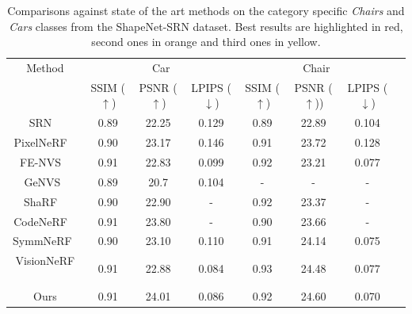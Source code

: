 \begin{table}[h!]
\caption{Comparisons against state of the art methods on the category specific \textit{Chairs} and \textit{Cars} classes from the ShapeNet-SRN dataset. Best results are highlighted in red, second ones in orange and third ones in yellow. }
\label{table:comp_res}
\begin{center}%
\begin{adjustbox}{width = \linewidth}
\begin{tabular}[h]{c||ccccccc}
\hline
 Method & \multicolumn{3}{c}{Car} & \multicolumn{3}{c}{Chair} \\
 &  SSIM ($\uparrow$) & PSNR ($\uparrow$) & LPIPS ($\downarrow$) & SSIM ($\uparrow$) & PSNR ($\uparrow$)) & LPIPS ($\downarrow$)\\
\hline
SRN ~\citep{sitzmann2019scene}& \cellcolor{yellow!25}0.89 & 22.25 & 0.129 & 0.89 & 22.89 & 0.104\\
PixelNeRF ~\citep{yu2021pixelnerf} & \cellcolor{orange!25}0.90 & 23.17 & 0.146 & \cellcolor{yellow!25}0.91 & 23.72 & 0.128\\
FE-NVS ~\citep{guo2022fast} & \cellcolor{red!25}0.91 & 22.83 & \cellcolor{yellow!25}0.099 & \cellcolor{orange!25}0.92 & 23.21 & 0.077 \\
GeNVS~\citep{chan2023genvs}& \cellcolor{yellow!25}0.89 & 20.7 & 0.104 & - & - & - \\
ShaRF ~\citep{rematas2021sharf} & \cellcolor{orange!25}0.90 & 22.90 & - & \cellcolor{orange!25}0.92 & 23.37 & - \\
CodeNeRF ~\citep{jang2021codenerf} & \cellcolor{red!25}0.91 & \cellcolor{orange!25}23.80 & - & 0.90 & 23.66 & -  \\
SymmNeRF\footnotemark~\citep{li2022symmnerf}& \cellcolor{orange!25}0.90 & \cellcolor{yellow!25}23.10 & 0.110 & \cellcolor{yellow!25}0.91 & \cellcolor{yellow!25}24.14  & \cellcolor{orange!25}0.075 \\
VisionNeRF ~\citep{lin2023vision} & \cellcolor{red!25}0.91 & 22.88 & \cellcolor{red!25}0.084 & \cellcolor{red!25}0.93 & \cellcolor{orange!25}24.48  & \cellcolor{yellow!25}0.077 \\
Ours &\cellcolor{red!25} 0.91 & \cellcolor{red!25} 24.01  &\cellcolor{orange!25}  0.086 &  \cellcolor{orange!25}0.92   & \cellcolor{red!25}24.60&  \cellcolor{red!25}0.070 \\

\hline 
\end{tabular}
\end{adjustbox}
\end{center}
\end{table}

